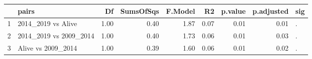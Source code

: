 \begin{table}[ht]
\centering
\begin{tabular}{rlrrrrrrl}
  \hline
 & pairs & Df & SumsOfSqs & F.Model & R2 & p.value & p.adjusted & sig \\ 
  \hline
1 & 2014\_2019 vs Alive & 1.00 & 0.40 & 1.87 & 0.07 & 0.01 & 0.01 & . \\ 
  2 & 2014\_2019 vs 2009\_2014 & 1.00 & 0.40 & 1.73 & 0.06 & 0.01 & 0.03 & . \\ 
  3 & Alive vs 2009\_2014 & 1.00 & 0.39 & 1.60 & 0.06 & 0.01 & 0.02 & . \\ 
   \hline
\end{tabular}
\end{table}
